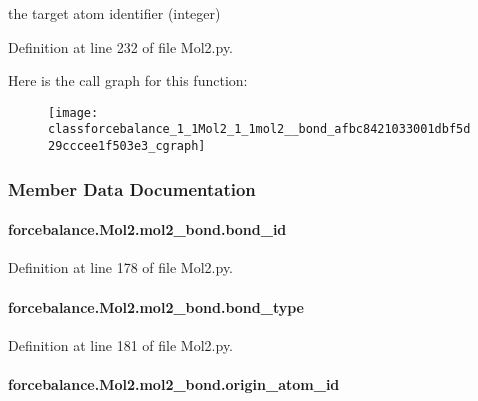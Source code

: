the target atom identifier (integer) 



Definition at line 232 of file Mol2.\-py.



Here is the call graph for this function\-:\nopagebreak
\begin{figure}[H]
\begin{center}
\leavevmode
\texttt{[image: classforcebalance\_1\_1Mol2\_1\_1mol2\_\_bond\_afbc8421033001dbf5d29cccee1f503e3\_cgraph]}
\end{center}
\end{figure}




\subsubsection{Member Data Documentation}
\hypertarget{classforcebalance_1_1Mol2_1_1mol2__bond_a4beddc1bfbe7a937e6c50574320c3c6e}{
\paragraph[{bond\-\_\-id}]{\setlength{\rightskip}{0pt plus 5cm}forcebalance.\-Mol2.\-mol2\-\_\-bond.\-bond\-\_\-id}}\label{classforcebalance_1_1Mol2_1_1mol2__bond_a4beddc1bfbe7a937e6c50574320c3c6e}


Definition at line 178 of file Mol2.\-py.

\hypertarget{classforcebalance_1_1Mol2_1_1mol2__bond_af9fe955c88cbf454863d50c871d3bd67}{
\paragraph[{bond\-\_\-type}]{\setlength{\rightskip}{0pt plus 5cm}forcebalance.\-Mol2.\-mol2\-\_\-bond.\-bond\-\_\-type}}\label{classforcebalance_1_1Mol2_1_1mol2__bond_af9fe955c88cbf454863d50c871d3bd67}


Definition at line 181 of file Mol2.\-py.

\hypertarget{classforcebalance_1_1Mol2_1_1mol2__bond_ae24bf013368c83923716d78ae6e393b1}{
\paragraph[{origin\-\_\-atom\-\_\-id}]{\setlength{\rightskip}{0pt plus 5cm}forcebalance.\-Mol2.\-mol2\-\_\-bond.\-origin\-\_\-atom\-\_\-id}}\label{classforcebalance_1_1Mol2_1_1mol2__bond_ae24bf013368c83923716d78ae6e393b1}



